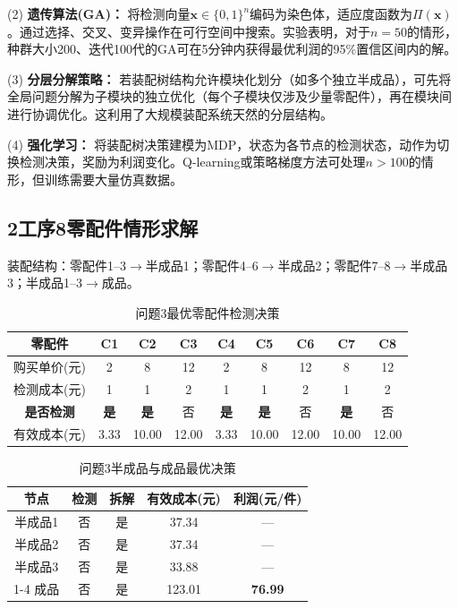 \documentclass[12pt,a4paper]{ctexart}
\begin{document}
(2) \textbf{遗传算法(GA)：} 将检测向量$\mathbf{x} \in \{0,1\}^n$编码为染色体，适应度函数为$\Pi(\mathbf{x})$。通过选择、交叉、变异操作在可行空间中搜索。实验表明，对于$n=50$的情形，种群大小200、迭代100代的GA可在5分钟内获得最优利润的95\%置信区间内的解。

(3) \textbf{分层分解策略：} 若装配树结构允许模块化划分（如多个独立半成品），可先将全局问题分解为子模块的独立优化（每个子模块仅涉及少量零配件），再在模块间进行协调优化。这利用了大规模装配系统天然的分层结构。

(4) \textbf{强化学习：} 将装配树决策建模为MDP，状态为各节点的检测状态，动作为切换检测决策，奖励为利润变化。Q-learning或策略梯度方法可处理$n>100$的情形，但训练需要大量仿真数据。

\subsection{2工序8零配件情形求解}

装配结构：零配件1--3$\to$半成品1；零配件4--6$\to$半成品2；零配件7--8$\to$半成品3；半成品1--3$\to$成品。

\begin{table}[H]
\centering
\caption{问题3最优零配件检测决策}
\begin{tabular}{ccccccccc}
\toprule
\textbf{零配件} & C1 & C2 & C3 & C4 & C5 & C6 & C7 & C8 \\
\midrule
购买单价(元) & 2 & 8 & 12 & 2 & 8 & 12 & 8 & 12 \\
检测成本(元) & 1 & 1 & 2 & 1 & 1 & 2 & 1 & 2 \\
\textbf{是否检测} & \textbf{是} & \textbf{是} & 否 & \textbf{是} & \textbf{是} & 否 & \textbf{是} & 否 \\
有效成本(元) & 3.33 & 10.00 & 12.00 & 3.33 & 10.00 & 12.00 & 10.00 & 12.00 \\
\bottomrule
\end{tabular}
\end{table}

\begin{table}[H]
\centering
\caption{问题3半成品与成品最优决策}
\begin{tabular}{ccccc}
\toprule
\textbf{节点} & \textbf{检测} & \textbf{拆解} & \textbf{有效成本(元)} & \textbf{利润(元/件)} \\
\midrule
半成品1 & 否 & 是 & 37.34 & — \\
半成品2 & 否 & 是 & 37.34 & — \\
半成品3 & 否 & 是 & 33.88 & — \\
\cmidrule{1-4}
成品 & 否 & 是 & 123.01 & \textbf{76.99} \\
\bottomrule
\end{tabular}
\end{table}
\end{document}
